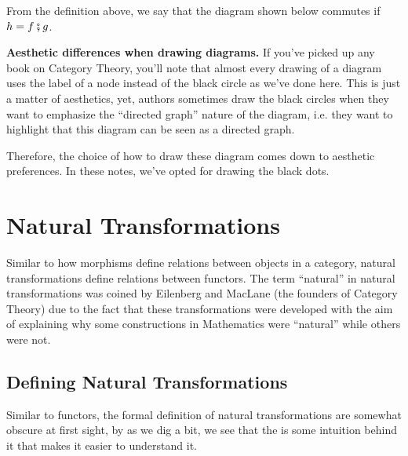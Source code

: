 From the definition above, we say that the diagram shown below commutes
if $h = f \fatsemi g$.

\begin{shaded}
	\textbf{Aesthetic differences when drawing diagrams.}
	If you've picked up any book on Category Theory, you'll note that almost every
	drawing of a diagram uses the label of a node instead of the black circle
	as we've done here. This is just a matter of aesthetics, yet, authors
	sometimes draw the black circles when they want to emphasize the
	``directed graph'' nature of the diagram, i.e. they want to highlight
	that this diagram can be seen as a directed graph.

	Therefore, the choice of how to draw these diagram comes down to
	aesthetic preferences. In these notes, we've opted for drawing the
	black dots.
\end{shaded}


\section{Natural Transformations}

Similar to how morphisms define relations between objects in a category, natural transformations
define relations between functors.
The term ``natural'' in natural transformations was coined by Eilenberg and MacLane (the founders
of Category Theory) due to the fact that these transformations were developed with the
aim of explaining why some constructions in Mathematics were ``natural'' while others
were not.


\subsection{Defining Natural Transformations}

Similar to functors, the formal definition of natural transformations
are somewhat obscure at first sight, by as we dig a bit, we see that the is
some intuition behind it that makes it easier to understand it.

